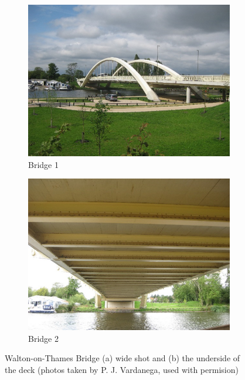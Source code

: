 \begin{figure}[ht]
     \centering
     \begin{subfigure}[b]{0.45\textwidth}
         \centering
         \includegraphics[width=\textwidth]{figures/fig_bridge1}
         \caption{Bridge 1}
         \label{fig_bridge1}
     \end{subfigure}
     \hfill
     \begin{subfigure}[b]{0.45\textwidth}
         \centering
         \includegraphics[width=\textwidth]{figures/fig_bridge2}
         \caption{Bridge 2}
         \label{fig_bridge2}
     \end{subfigure}
        \caption{Walton-on-Thames Bridge (a) wide shot and (b) the underside of the deck
(photos taken by P. J. Vardanega, used with permision)}
        \label{fig_twobridges}
\end{figure}